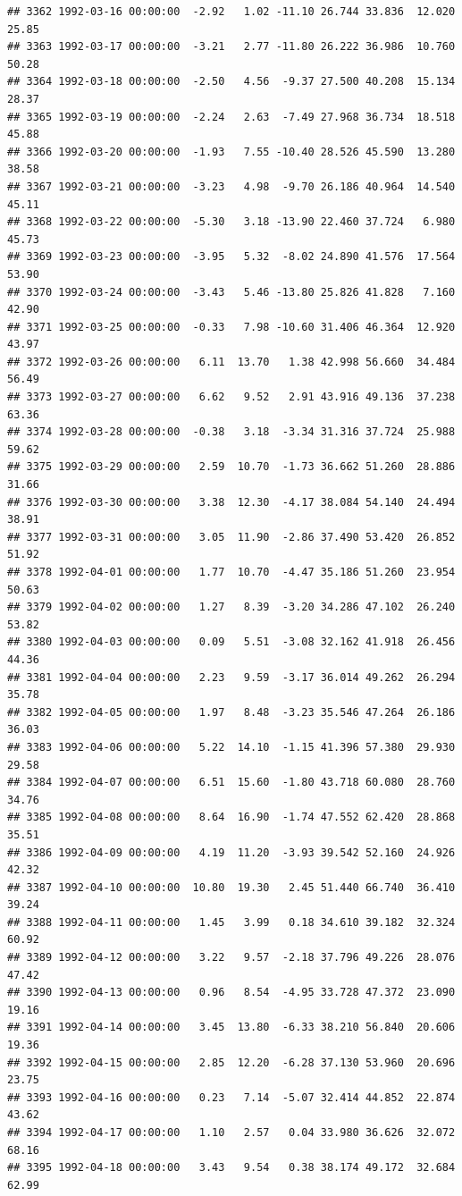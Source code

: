 \documentclass{article}\usepackage{graphicx, color}
\makeatletter
\newenvironment{kframe}{%
 \def\at@end@of@kframe{}%
 \ifinner\ifhmode%
  \def\at@end@of@kframe{\end{minipage}}%
  \begin{minipage}{\columnwidth}%
 \fi\fi%
 \def\FrameCommand##1{\hskip\@totalleftmargin \hskip-\fboxsep
 \colorbox{shadecolor}{##1}\hskip-\fboxsep
     \hskip-\linewidth \hskip-\@totalleftmargin \hskip\columnwidth}%
 \MakeFramed {\advance\hsize-\width
   \@totalleftmargin\z@ \linewidth\hsize
   \@setminipage}}%
 {\par\unskip\endMakeFramed%
 \at@end@of@kframe}
\newenvironment{knitrout}{}{} %
\makeatother
\begin{document}
\begin{knitrout}
\begin{kframe}
\begin{verbatim}
## 3362 1992-03-16 00:00:00  -2.92   1.02 -11.10 26.744 33.836  12.020  25.85
## 3363 1992-03-17 00:00:00  -3.21   2.77 -11.80 26.222 36.986  10.760  50.28
## 3364 1992-03-18 00:00:00  -2.50   4.56  -9.37 27.500 40.208  15.134  28.37
## 3365 1992-03-19 00:00:00  -2.24   2.63  -7.49 27.968 36.734  18.518  45.88
## 3366 1992-03-20 00:00:00  -1.93   7.55 -10.40 28.526 45.590  13.280  38.58
## 3367 1992-03-21 00:00:00  -3.23   4.98  -9.70 26.186 40.964  14.540  45.11
## 3368 1992-03-22 00:00:00  -5.30   3.18 -13.90 22.460 37.724   6.980  45.73
## 3369 1992-03-23 00:00:00  -3.95   5.32  -8.02 24.890 41.576  17.564  53.90
## 3370 1992-03-24 00:00:00  -3.43   5.46 -13.80 25.826 41.828   7.160  42.90
## 3371 1992-03-25 00:00:00  -0.33   7.98 -10.60 31.406 46.364  12.920  43.97
## 3372 1992-03-26 00:00:00   6.11  13.70   1.38 42.998 56.660  34.484  56.49
## 3373 1992-03-27 00:00:00   6.62   9.52   2.91 43.916 49.136  37.238  63.36
## 3374 1992-03-28 00:00:00  -0.38   3.18  -3.34 31.316 37.724  25.988  59.62
## 3375 1992-03-29 00:00:00   2.59  10.70  -1.73 36.662 51.260  28.886  31.66
## 3376 1992-03-30 00:00:00   3.38  12.30  -4.17 38.084 54.140  24.494  38.91
## 3377 1992-03-31 00:00:00   3.05  11.90  -2.86 37.490 53.420  26.852  51.92
## 3378 1992-04-01 00:00:00   1.77  10.70  -4.47 35.186 51.260  23.954  50.63
## 3379 1992-04-02 00:00:00   1.27   8.39  -3.20 34.286 47.102  26.240  53.82
## 3380 1992-04-03 00:00:00   0.09   5.51  -3.08 32.162 41.918  26.456  44.36
## 3381 1992-04-04 00:00:00   2.23   9.59  -3.17 36.014 49.262  26.294  35.78
## 3382 1992-04-05 00:00:00   1.97   8.48  -3.23 35.546 47.264  26.186  36.03
## 3383 1992-04-06 00:00:00   5.22  14.10  -1.15 41.396 57.380  29.930  29.58
## 3384 1992-04-07 00:00:00   6.51  15.60  -1.80 43.718 60.080  28.760  34.76
## 3385 1992-04-08 00:00:00   8.64  16.90  -1.74 47.552 62.420  28.868  35.51
## 3386 1992-04-09 00:00:00   4.19  11.20  -3.93 39.542 52.160  24.926  42.32
## 3387 1992-04-10 00:00:00  10.80  19.30   2.45 51.440 66.740  36.410  39.24
## 3388 1992-04-11 00:00:00   1.45   3.99   0.18 34.610 39.182  32.324  60.92
## 3389 1992-04-12 00:00:00   3.22   9.57  -2.18 37.796 49.226  28.076  47.42
## 3390 1992-04-13 00:00:00   0.96   8.54  -4.95 33.728 47.372  23.090  19.16
## 3391 1992-04-14 00:00:00   3.45  13.80  -6.33 38.210 56.840  20.606  19.36
## 3392 1992-04-15 00:00:00   2.85  12.20  -6.28 37.130 53.960  20.696  23.75
## 3393 1992-04-16 00:00:00   0.23   7.14  -5.07 32.414 44.852  22.874  43.62
## 3394 1992-04-17 00:00:00   1.10   2.57   0.04 33.980 36.626  32.072  68.16
## 3395 1992-04-18 00:00:00   3.43   9.54   0.38 38.174 49.172  32.684  62.99

\end{verbatim}
\end{kframe}
\end{knitrout}
\end{document}
